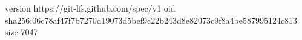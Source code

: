 version https://git-lfs.github.com/spec/v1
oid sha256:06c78af47f7b7270d19073d5bef9c22b243d8e82073c9f8a4be587995124c813
size 7047
